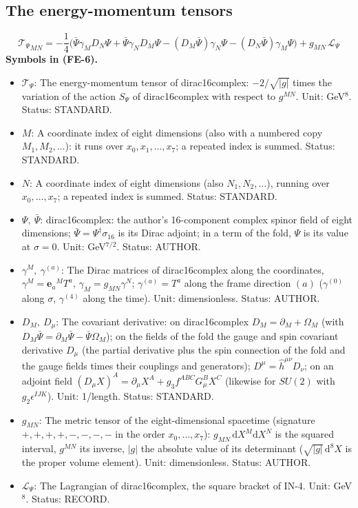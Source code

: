 \documentclass[
  10pt,
]{article}
\providecommand{\tightlist}{%
  \setlength{\itemsep}{0pt}\setlength{\parskip}{0pt}}
\begin{document}
\hypertarget{the-energy-momentum-tensors}{%
\subsection{The energy-momentum
tensors}\label{the-energy-momentum-tensors}}

\[
{\mathcal{T}_\Psi}_{MN} = -\frac14\Big(\bar\Psi\gamma_MD_N\Psi + \bar\Psi\gamma_ND_M\Psi - (D_M\bar\Psi)\gamma_N\Psi
 - (D_N\bar\Psi)\gamma_M\Psi\Big) + g_{MN}\,\mathcal{L}_\Psi \tag{FE-6}
\] \textbf{Symbols in (FE-6).}

\begin{itemize}
\tightlist
\item
  \(\mathcal{T}_\Psi\): The energy-momentum tensor of dirac16complex:
  \(-2/\sqrt{\lvert g\rvert}\) times the variation of the action
  \(S_\Psi\) of dirac16complex with respect to \(g^{MN}\). Unit:
  GeV\(^8\). Status: STANDARD.
\item
  \(M\): A coordinate index of eight dimensions (also with a numbered
  copy \(M_1, M_2, \dots\)): it runs over \(x_0, x_1, \dots, x_7\); a
  repeated index is summed. Status: STANDARD.
\item
  \(N\): A coordinate index of eight dimensions (also
  \(N_1, N_2, \dots\)), running over \(x_0, \dots, x_7\); a repeated
  index is summed. Status: STANDARD.
\item
  \(\Psi,\ \bar\Psi\): dirac16complex: the author's 16-component complex
  spinor field of eight dimensions;
  \(\bar\Psi = \Psi^\dagger\sigma_{16}\) is its Dirac adjoint; in a term
  of the fold, \(\Psi\) is its value at \(\sigma = 0\). Unit:
  GeV\(^{7/2}\). Status: AUTHOR.
\item
  \(\gamma^M,\ \gamma^{(a)}\): The Dirac matrices of dirac16complex
  along the coordinates, \(\gamma^M = \mathbf{e}_a{}^MT^a\),
  \(\gamma_M = g_{MN}\gamma^N\); \(\gamma^{(a)} = T^a\) along the frame
  direction \((a)\) (\(\gamma^{(0)}\) along \(\sigma\), \(\gamma^{(4)}\)
  along the time). Unit: dimensionless. Status: AUTHOR.
\item
  \(D_M,\ D_\mu\): The covariant derivative: on dirac16complex
  \(D_M = \partial_M + \Omega_M\) (with
  \(D_M\bar\Psi = \partial_M\bar\Psi - \bar\Psi\Omega_M\)); on the
  fields of the fold the gauge and spin covariant derivative \(D_\mu\)
  (the partial derivative plus the spin connection of the fold and the
  gauge fields times their couplings and generators);
  \(D^\mu = \hat h^{\mu\nu}D_\nu\); on an adjoint field
  \((D_\mu X)^A = \partial_\mu X^A + g_3f^{ABC}G^B_\mu X^C\) (likewise
  for \(SU(2)\) with \(g_2\epsilon^{IJK}\)). Unit: 1/length. Status:
  STANDARD.
\item
  \(g_{MN}\): The metric tensor of the eight-dimensional spacetime
  (signature \(+,+,+,+,-,-,-,-\) in the order \(x_0, \dots, x_7\)):
  \(g_{MN}\,\mathrm{d}X^M\mathrm{d}X^N\) is the squared interval,
  \(g^{MN}\) its inverse, \(\lvert g\rvert\) the absolute value of its
  determinant (\(\sqrt{\lvert g\rvert}\,\mathrm{d}^8X\) is the proper
  volume element). Unit: dimensionless. Status: AUTHOR.
\item
  \(\mathcal{L}_\Psi\): The Lagrangian of dirac16complex, the square
  bracket of IN-4. Unit: GeV\(^8\). Status: RECORD.
\end{itemize}
\end{document}
